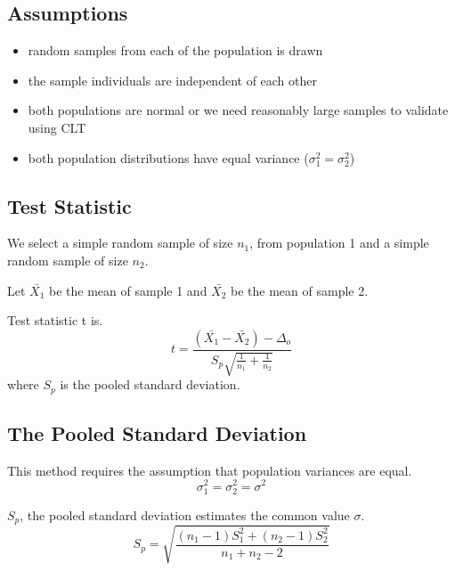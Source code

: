 \documentclass{article}
\begin{document}
        \subsection*{Assumptions}
        \begin{itemize}
            \item random samples from each of the population is drawn
            \item the sample individuals are independent of each other
            \item both populations are normal or we need reasonably large samples to validate using CLT
            \item both population distributions have equal variance ($\sigma_{1}^{2} = \sigma_{2}^{2}$)
        \end{itemize}
       
        \subsection*{Test Statistic}
        We select a simple random sample of size $n_{1}$, from population 1 and a simple random sample 
        of size $n_{2}$.\par
        Let $\bar{X_{1}}$ be the mean of sample 1 and $\bar{X_{2}}$ be the mean of sample 2.\par

        Test statistic t is.
        \begin{equation*}
            t = \frac{(\bar{X_{1}} - \bar{X_{2}})-\Delta_{o}}{S_{p} \sqrt{\frac{1}{n_{1}}+\frac{1}{n_{2}}}}
        \end{equation*}
        where $S_{p}$ is the pooled standard deviation.

        \subsection*{The Pooled Standard Deviation}
        This method requires the assumption that population variances are equal.
        \begin{equation*}
            \sigma_{1}^{2} =  \sigma_{2}^{2} =  \sigma^{2}
        \end{equation*}

        $S_{p}$, the pooled standard deviation estimates the common value $\sigma$.
        \begin{equation*}
            S_{p} = \sqrt{\frac{(n_{1}-1)S_{1}^{2}+(n_{2} - 1) S_{2}^{2}}{n_{1}+n_{2} -2}}
        \end{equation*}
\end{document}
